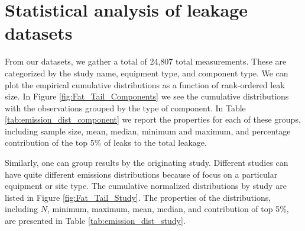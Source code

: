 \documentclass[11pt]{report}
\begin{document}
\section{Statistical analysis of leakage datasets}

From our datasets, we gather a total of 24,807 total measurements. These are categorized by the study name, equipment type, and component type. We can plot the empirical cumulative distributions as a function of rank-ordered leak size. In Figure \ref{fig:Fat_Tail_Components} we see the cumulative distributions with the observations grouped by the type of component.  In Table \ref{tab:emission_dist_component} we report the properties for each of these groups, including sample size, mean, median, minimum and maximum, and percentage contribution of the top 5\% of leaks to the total leakage.

Similarly, one can group results by the originating study. Different studies can have quite different emissions distributions because of focus on a particular equipment or site type. The cumulative normalized distributions by study are listed in Figure \ref{fig:Fat_Tail_Study}. The properties of the distributions, including $N$, minimum, maximum, mean, median, and contribution of top 5\%, are presented in Table \ref{tab:emission_dist_study}.
\end{document}
